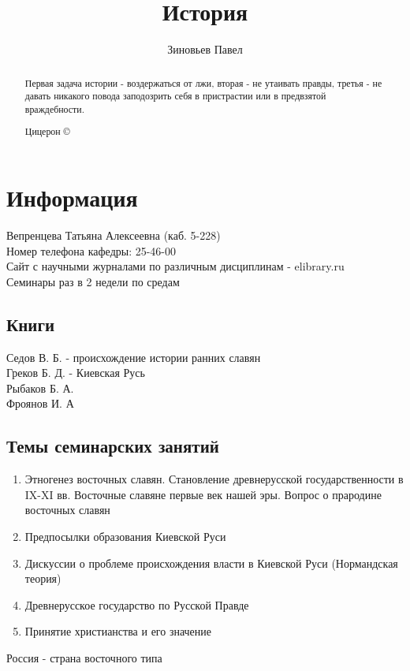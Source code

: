 \documentclass[a4paper, 11pt, oneside]{article}
\title{История}
\author{Зиновьев Павел}
\begin{document}
\maketitle
\begin{abstract}
	Первая задача истории - воздержаться от лжи, вторая - не утаивать правды, третья - не давать никакого повода 
	заподозрить себя в пристрастии или в предвзятой враждебности.
	\begin{flushright}
		 Цицерон \copyright
	\end{flushright}
\end{abstract}
\newpage
\tableofcontents
\newpage

\section{Информация}
Вепренцева Татьяна Алексеевна (каб. 5-228)\\
Номер телефона кафедры: 25-46-00\\
Сайт с научными журналами по различным дисциплинам - elibrary.ru\\
Семинары раз в 2 недели по средам
\subsection{Книги}
Седов В. Б. - происхождение истории ранних славян\\
Греков Б. Д. - Киевская Русь\\
Рыбаков Б. А.\\
Фроянов И. А


\subsection{Темы семинарских занятий}

\begin{enumerate}
\item Этногенез восточных славян. Становление древнерусской государственности в IX-XI вв. Восточные славяне первые век нашей эры. Вопрос о прародине восточных славян
\item Предпосылки образования Киевской Руси
\item Дискуссии о проблеме происхождения власти в Киевской Руси (Нормандская теория)
\item Древнерусское государство по Русской Правде
\item Принятие христианства и его значение
\end{enumerate}

Россия - страна восточного типа
\end{document}

